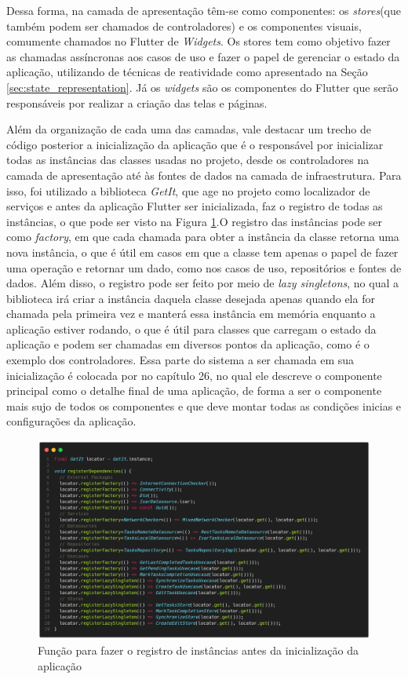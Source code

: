 \documentclass[12pt, %
openright, 
oneside, %
a4paper,    %
brazil]{facom-ufu-abntex2}
\begin{document}
Dessa forma, na camada de apresentação têm-se como componentes: os \textit{stores}(que também podem ser chamados de controladores) e os componentes visuais, comumente chamados no Flutter de \textit{Widgets}. Os stores tem como objetivo fazer as chamadas assíncronas aos casos de uso e fazer o papel de gerenciar o estado da aplicação, utilizando de técnicas de reatividade como apresentado na Seção \ref{sec:state_representation}. Já os \textit{widgets} são os componentes do Flutter que serão responsáveis por realizar a criação das telas e páginas.

Além da organização de cada uma das camadas, vale destacar um trecho de código posterior a inicialização da aplicação que é o responsável por inicializar todas as instâncias das classes usadas no projeto, desde os controladores na camada de apresentação até às fontes de dados na camada de infraestrutura. Para isso, foi utilizado a biblioteca \textit{GetIt}, que age no projeto como localizador de serviços e antes da aplicação Flutter ser inicializada, faz o registro de todas as instâncias, o que pode ser visto na Figura \ref{fig:service_locator}.O registro das instâncias pode ser como \textit{factory}, em que cada chamada para obter a instância da classe retorna uma nova instância, o que é útil em casos em que a classe tem apenas o papel de fazer uma operação e retornar um dado, como nos casos de uso, repositórios e fontes de dados. Além disso, o registro pode ser feito por meio de \textit{lazy singletons}, no qual a biblioteca irá criar a instância daquela classe desejada apenas quando ela for chamada pela primeira vez e manterá essa instância em memória enquanto a aplicação estiver rodando, o que é útil para classes que carregam o estado da aplicação e podem ser chamadas em diversos pontos da aplicação, como é o exemplo dos controladores. Essa parte do sistema a ser chamada em sua inicialização é colocada por  no capítulo 26, no qual ele descreve o componente principal como o detalhe final de uma aplicação, de forma a ser o componente mais sujo de todos os componentes e que deve montar todas as condições inicias e configurações da aplicação.

\begin{figure}[ht]
    \centering
    \includegraphics[width=.85\textwidth, trim={0 30 0 100}, clip]{figures/arch/service_locator.png}
    \caption{Função para fazer o registro de instâncias antes da inicialização da aplicação}
    \label{fig:service_locator}
\end{figure}
\end{document}
